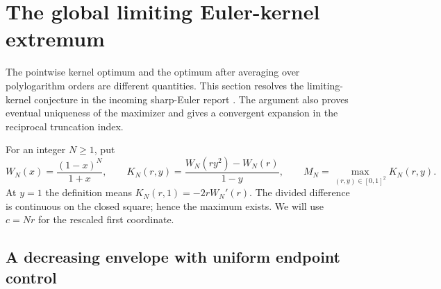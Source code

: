 \documentclass[11pt]{article}
\numberwithin{equation}{section}
\theoremstyle{definition}
\theoremstyle{remark}
\begin{document}
\section{The global limiting Euler-kernel extremum}
\label{sec:kernel-extrema}

The pointwise kernel optimum and the optimum after averaging over
polylogarithm orders are different quantities. This section resolves the
limiting-kernel conjecture in the incoming sharp-Euler report
\cite{SharpEulerIncoming}. The argument also proves eventual uniqueness
of the maximizer and gives a convergent expansion in the reciprocal
truncation index.

For an integer $N\ge1$, put
\begin{equation}\label{eq:kernel-def}
 W_N(x)=\frac{(1-x)^N}{1+x},\qquad
 K_N(r,y)=\frac{W_N(ry^2)-W_N(r)}{1-y},\qquad
 M_N=\max_{(r,y)\in[0,1]^2}K_N(r,y).
\end{equation}
At $y=1$ the definition means $K_N(r,1)=-2rW_N'(r)$.
The divided difference is continuous on the closed square; hence the
maximum exists. We will use $c=Nr$ for the rescaled first coordinate.

\subsection{A decreasing envelope with uniform endpoint control}
\end{document}
